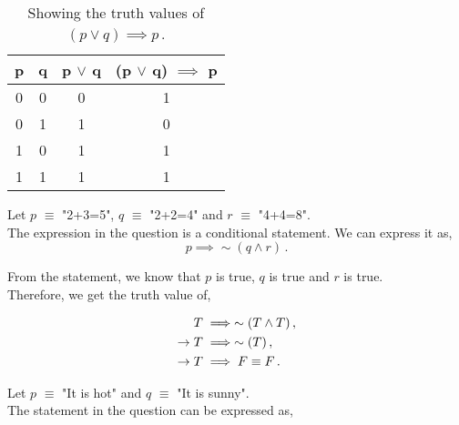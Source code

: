 \begin{subquestions}
\begin{subsubquestions}
\begin{table}[ht]
	\centering
	\begin{tabular}{|c|c|c|c|}
		\hline
		p & q & p $\lor$ q & (p $\lor$ q) $\implies$ p \\
		\hline
		0 & 0 & 0 & 1 \\
		0 & 1 & 1 & 0 \\
		1 & 0 & 1 & 1 \\
		1 & 1 & 1 & 1 \\
		\hline
	\end{tabular}
	\caption{\label{2012:q2:TruthTab2} Showing the truth values of $(p \lor q) \implies p$\,.}
\end{table}
\end{subsubquestions}


\subquestion

Let $p$ $\equiv$ "2+3=5", $q$ $\equiv$ "2+2=4" and $r$ $\equiv$ "4+4=8". \\	
The expression in the question is a conditional statement. We can express it as, 
\begin{equation}
	p \implies \sim (q \land r)\,.
\end{equation}

From the statement, we know that $p$ is true, $q$ is true and $r$ is true. \\
Therefore, we get the truth value of,

\begin{align}
	T & \implies \sim(T \land T)\,, \nonumber \\
	\rightarrow T & \implies \sim(T)\,, \nonumber \\
	\rightarrow T & \implies F \equiv F\,.
\end{align}


\subquestion

\begin{subsubquestions}
	
\subsubquestion
Let $p$ $\equiv$ "It is hot" and $q$ $\equiv$ "It is sunny". \\

The statement in the question can be expressed as,


\end{subsubquestions}
\end{subquestions}
